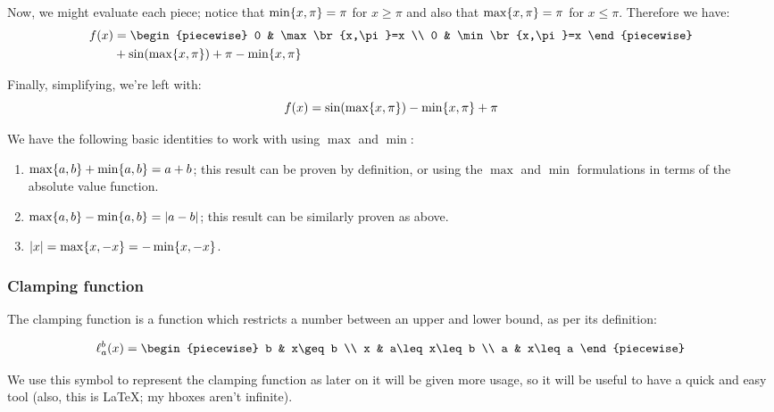 \begin{example}
    Now, we might evaluate each piece; notice that $\min\{x,\pi\}=\pi$ for $x\geq\pi$ and also that $\max\{x,\pi\}=\pi$ for $x\leq\pi$. Therefore we have:
    \begin{align*}
        f(x) &= \begin{piecewise}
            0 & \max\br{x,\pi}=x \\
            0 & \min\br{x,\pi}=x
        \end{piecewise} \\
        &+\sin(\max\br{x,\pi})+\pi - \min\br{x,\pi}
    \end{align*}

    Finally, simplifying, we're left with:
    $$
        f(x) = \sin(\max\{x,\pi\})-\min\{x,\pi\}+\pi
    $$
\end{example}

\begin{theorem}
    We have the following basic identities to work with using $\max$ and $\min$:
    \begin{enumerate}
        \item $\max\{a,b\}+\min\{a,b\}=a+b$; this result can be proven by definition, or using the $\max$ and $\min$ formulations in terms of the absolute value function.
        \item $\max\{a,b\}-\min\{a,b\}=\abs{a-b}$; this result can be similarly proven as above.
        \item $\abs{x}=\max\{x,-x\}=-\min\{x,-x\}$.
    \end{enumerate}
\end{theorem}

\subsubsection{Clamping function}
The clamping function is a function which restricts a number between an upper and lower bound, as per its definition:

$$
\ell_{a}^{b}(x)=\begin{piecewise}
    b & x\geq b \\
    x & a\leq x\leq b \\
    a & x\leq a
\end{piecewise}
$$

We use this symbol to represent the clamping function as later on it will be given more usage, so it will be useful to have a quick and easy tool (also, this is LaTeX; my hboxes aren't infinite).

